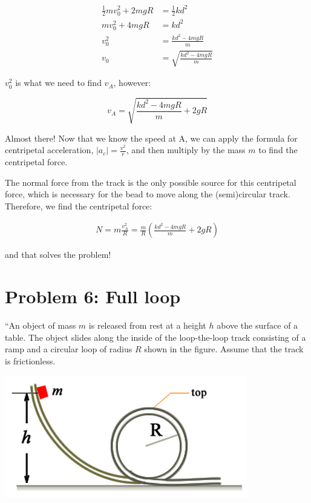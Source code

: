 \documentclass[12pt,a4paper]{report}
\begin{document}
\begin{align}
\frac{1}{2} m v_0^2 + 2 m g R &= \frac{1}{2} k d^2\\
m v_0^2 + 4 m g R &= k d^2\\
v_0^2 &= \frac{k d^2 - 4 m g R}{m}\\
v_0   &= \sqrt{\frac{k d^2 - 4 m g R}{m}}
\end{align}

$v_0^2$ is what we need to find $v_A$, however:

\begin{equation}
v_A = \sqrt{\frac{k d^2 - 4 m g R}{m} + 2 g R}
\end{equation}

Almost there! Now that we know the speed at A, we can apply the formula for centripetal acceleration, $\displaystyle |a_c| = \frac{v^2}{r}$, and then multiply by the mass $m$ to find the centripetal force.

The normal force from the track is the only possible source for this centripetal force, which is necessary for the bead to move along the (semi)circular track. Therefore, we find the centripetal force:

\begin{align}
N = m \frac{v_A^2}{R} = \frac{m}{R} \left(\frac{k d^2 - 4 m g R}{m} + 2 g R\right)
\end{align}

and that solves the problem!

\section{Problem 6: Full loop}

``An object of mass $m$ is released from rest at a height $h$ above the surface of a table. The object slides along the inside of the loop-the-loop track consisting of a ramp and a circular loop of radius $R$ shown in the figure. Assume that the track is frictionless.

\begin{center}
\includegraphics[scale=0.6]{Graphics/h4p6}
\end{center}
\end{document}
